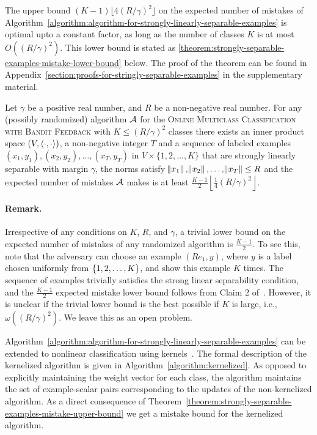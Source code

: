 The upper bound $(K-1) \lfloor 4(R/\gamma)^2 \rfloor$ on the expected number of
mistakes of
Algorithm~\ref{algorithm:algorithm-for-strongly-linearly-separable-examples} is
optimal upto a constant factor, as long as the number of classes $K$ is at most
$O((R/\gamma)^2)$. This lower bound is stated as
\autoref{theorem:strongly-separable-examples-mistake-lower-bound} below. The
proof of the theorem can be found in
Appendix~\ref{section:proofs-for-stringly-separable-examples} in the
supplementary material.

\begin{theorem}
\label{theorem:strongly-separable-examples-mistake-lower-bound}
Let $\gamma$ be a positive real number, and $R$ be a non-negative real
number. For any (possibly randomized) algorithm $\mathcal{A}$ for the \textsc{Online
Multiclass Classification with Bandit Feedback} with $K \le
(R/\gamma)^2$ classes there exists an inner product space $(V,
\left\langle \cdot, \cdot \right\rangle)$, a non-negative integer $T$ and a sequence of labeled
examples $(x_1, y_1), (x_2, y_2), \dots, (x_T, y_T)$ in $V \times
\{1,2,\dots,K\}$ that are strongly linearly separable with margin $\gamma$, the
norms satisfy $\norm{x_1}, \norm{x_2}, \dots, \norm{x_T} \le R$ and the expected
number of mistakes $\mathcal{A}$ makes is at least $\frac{K-1}{2} \left\lfloor
\frac{1}{4} (R/\gamma)^2 \right\rfloor$.
\end{theorem}

\paragraph{Remark.} Irrespective of any conditions on $K$, $R$, and $\gamma$, a
trivial lower bound on the expected number of mistakes of any randomized
algorithm is $\frac{K-1}{2}$. To see this, note that the adversary can choose an
example $(R e_1, y)$, where $y$ is a label chosen uniformly from
$\cbr{1,2,\dots,K}$, and show this example $K$ times. The sequence of examples
trivially satisfies the strong linear separability condition, and the
$\frac{K-1}{2}$ expected mistake lower bound follows from Claim 2
of~\citet{Daniely-Helbertal-2013}. However, it is unclear if the trivial lower
bound is the best possible if $K$ is large, i.e., $\omega((R/\gamma)^2)$. We
leave this as an open problem.

Algorithm~\ref{algorithm:algorithm-for-strongly-linearly-separable-examples} can
be extended to nonlinear classification using
kernels~\cite{Scholkopf-Smola-2002, Shawe-Taylor-Cristianini-2004}. The formal
description of the kernelized algorithm is given in
Algorithm~\ref{algorithm:kernelized}. As opposed to explicitly maintaining the
weight vector for each class, the algorithm maintains the set of example-scalar
pairs corresponding to the updates of the non-kernelized algorithm. As a direct
consequence of
Theorem~\ref{theorem:strongly-separable-examples-mistake-upper-bound} we get a
mistake bound for the kernelized algorithm.

